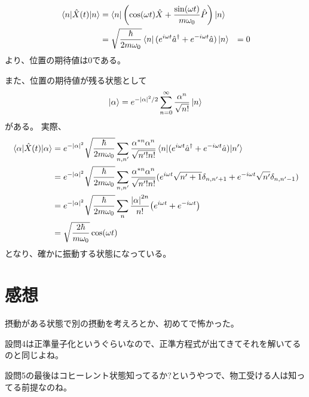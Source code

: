 \documentclass[../ap_2013.tex]{subfiles}
\begin{document}
\section{}
\begin{equation}\begin{aligned}[b]
    \mel{n}{\hat{X}(t)}{n}
        &=\bra{n}\qty(\cos(\omega t)\hat{X}+\frac{\sin(\omega t)}{m\omega_0}\hat{P})\ket{n}\\
        &=\sqrt{\frac{\hbar}{2m\omega_0}}\bra{n}(e^{i\omega t}\hat{a}^\dagger+e^{-i\omega t}\hat{a})\ket{n}
        &=0
\end{aligned}\end{equation}
より、位置の期待値は0である。

また、位置の期待値が残る状態として
\begin{equation}\begin{aligned}[b]
    \ket{\alpha} = e^{-\abs{\alpha}^2/2}\sum_{n=0}^{\infty}\frac{\alpha^n}{\sqrt{n!}}\ket{n}
\end{aligned}\end{equation}
がある。
実際、
\begin{equation}\begin{aligned}[b]
    \mel{\alpha}{\hat{X}(t)}{\alpha}
        &= e^{-\abs{\alpha}^2}\sqrt{\frac{\hbar}{2m\omega_0}}\sum_{n,n'}\frac{\alpha^{*n}\alpha^n}{\sqrt{n'!n!}}\mel{n}{(e^{i\omega t}\hat{a}^\dagger+e^{-i\omega t}\hat{a})}{n'}\\
        &= e^{-\abs{\alpha}^2}\sqrt{\frac{\hbar}{2m\omega_0}}\sum_{n,n'}\frac{\alpha^{*n}\alpha^n}{\sqrt{n'!n!}}(e^{i\omega t}\sqrt{n'+1}\delta_{n,n'+1}+e^{-i\omega t}\sqrt{n'}\delta_{n,n'-1})\\
        &= e^{-\abs{\alpha}^2}\sqrt{\frac{\hbar}{2m\omega_0}}\sum_n \frac{\abs{\alpha}^{2n}}{n!}\qty(e^{i\omega t}+e^{-i\omega t})\\
        &=\sqrt{\frac{2\hbar}{m\omega_0}}\cos(\omega t)
\end{aligned}\end{equation}
となり、確かに振動する状態になっている。

\section*{感想}
摂動がある状態で別の摂動を考えろとか、初めてで怖かった。

設問4は正準量子化というぐらいなので、正準方程式が出てきてそれを解いてるのと同じよね。

設問5の最後はコヒーレント状態知ってるか?というやつで、物工受ける人は知ってる前提なのね。
\end{document}
